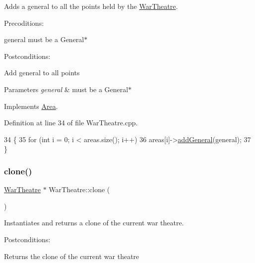 Adds a general to all the points held by the \hyperlink{classWarTheatre}{War\+Theatre}. 

Precoditions\+:
\begin{DoxyItemize}
\item general must be a General$\ast$
\end{DoxyItemize}

Postconditions\+:
\begin{DoxyItemize}
\item Add general to all points
\end{DoxyItemize}


\begin{DoxyParams}{Parameters}
{\em general} & must be a General$\ast$ \\
\hline
\end{DoxyParams}


Implements \hyperlink{classArea}{Area}.



Definition at line 34 of file War\+Theatre.\+cpp.


\begin{DoxyCode}
34                                             \{
35     \textcolor{keywordflow}{for} (\textcolor{keywordtype}{int} i = 0; i < areas.size(); i++)
36         areas[i]->\hyperlink{classWarTheatre_a1a8640cb110c90f2f2619344fc16a15e}{addGeneral}(general);
37 \}
\end{DoxyCode}
\mbox{\label{classWarTheatre_afc32ceef9af26ba4e858c91bf769aef9}} 
\subsubsection{\texorpdfstring{clone()}{clone()}}
{\footnotesize\ttfamily \hyperlink{classWarTheatre}{War\+Theatre} $\ast$ War\+Theatre\+::clone (\begin{DoxyParamCaption}{ }\end{DoxyParamCaption})\hspace{0.3cm}{\ttfamily [virtual]}}



Instantiates and returns a clone of the current war theatre. 

Postconditions\+:
\begin{DoxyItemize}
\item Returns the clone of the current war theatre
\end{DoxyItemize}

